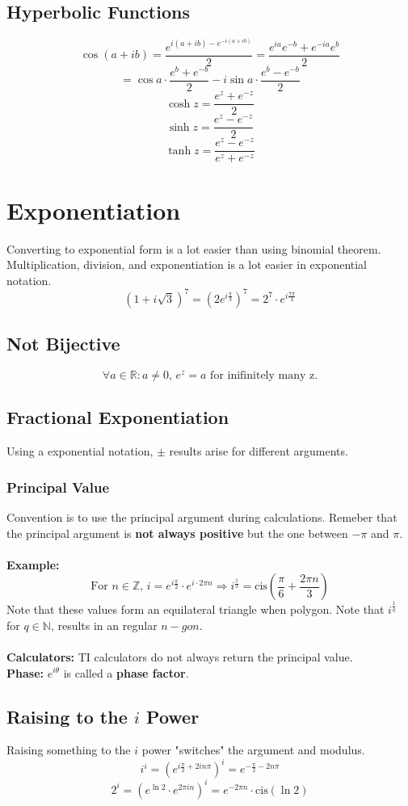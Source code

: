 \documentclass[../main.tex]{subfiles}
\begin{document}
\subsection{Hyperbolic Functions}
    $$\cos(a+ib)=\frac{e^{i(a+ib)-e^{-i(a+ib)}}}{2}=\frac{e^{ia}e^{-b}+e^{-ia}e^{b}}{2}$$
    $$=\cos a\cdot\frac{e^{b}+e^{-b}}{2}-i\sin a\cdot\frac{e^{b}-e^{-b}}{2}$$
    $$\cosh z=\frac{e^{z}+e^{-z}}{2}$$
    $$\sinh z=\frac{e^{z}-e^{-z}}{2}$$
    $$\tanh z = \frac{e^{z}-e^{-z}}{e^{z}+e^{-z}}$$

\section{Exponentiation}
Converting to exponential form is a lot easier than using binomial theorem.
Multiplication, division, and exponentiation is a lot easier in exponential notation.
$$(1+i\sqrt{3})^{7}=(2e^{i\frac{\pi}{3}})^7=2^{7}\cdot e^{i\frac{7\pi}{3}}$$
\subsection{Not Bijective}
    $$\forall a\in\mathbb{R} : a\neq 0\text{, }e^{z}=a\text{ for inifinitely many z.} $$
\subsection{Fractional Exponentiation}
    Using a exponential notation, $\pm$ results arise for different arguments.
    \subsubsection{Principal Value}
        Convention is to use the principal argument during calculations. Remeber that
        the principal argument is \textbf{not always positive} but the one between $-\pi$ and $\pi$.
        \\\\
        \textbf{Example: }   
            $$\text{For } n \in \mathbb{Z}\text{, }i=e^{i\frac{\pi}{2}}\cdot e^{i\cdot 2\pi n}\Rightarrow i^{\frac{1}{3}}=\text{cis}\left(\frac{\pi}{6}+\frac{2\pi n}{3}\right)$$
            Note that these values form an equilateral triangle when polygon. Note that $i^{\frac{1}{q}}$ for $q\in\mathbb{N}$, results in
            an regular $n-gon$.
        \\\\
        \noindent\textbf{Calculators:} TI calculators do not always return the principal value.\\
        \noindent\textbf{Phase:} $e^{i\theta}$ is called a \textbf{phase factor}.

\subsection{Raising to the $i$ Power}
    Raising something to the $i$ power "switches" the argument and modulus.
    $$i^i=(e^{i\frac{\pi}{2}+2in\pi})^{i}=e^{-\frac{\pi}{2}-2n\pi}$$
    $$2^{i}=(e^{\ln2}\cdot e^{2\pi in})^{i}=e^{-2\pi n}\cdot \text{cis}(\ln2)$$
\end{document}

